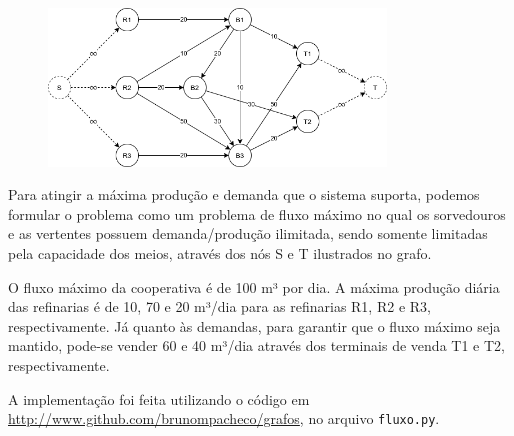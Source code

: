 \documentclass[a4paper]{report}
\begin{document}
\begin{figure}[H]
    \centering
    \includegraphics[width=0.8\textwidth]{L8_3.png}
\end{figure}

Para atingir a máxima produção e demanda que o sistema suporta, podemos formular o problema como um problema de fluxo máximo no qual os sorvedouros e as vertentes possuem demanda/produção ilimitada, sendo somente limitadas pela capacidade dos meios, através dos nós S e T ilustrados no grafo.

O fluxo máximo da cooperativa é de 100 m³ por dia. A máxima produção diária das refinarias é de 10, 70 e 20 m³/dia para as refinarias R1, R2 e R3, respectivamente. Já quanto às demandas, para garantir que o fluxo máximo seja mantido, pode-se vender 60 e 40 m³/dia através dos terminais de venda T1 e T2, respectivamente.

A implementação foi feita utilizando o código em \url{http://www.github.com/brunompacheco/grafos}, no arquivo \texttt{fluxo.py}.
\end{document}
